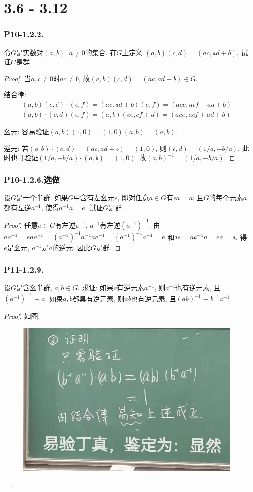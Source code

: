 \documentclass[12pt, a4paper, fontset=windows]{ctexart}
\newcommand{\xuan}{{\normalsize 选做}}
\begin{document}
\clearpage
{}
\part{3.6 - 3.12}

\section*{P10-1.2.2.}

令$G$是实数对$(a,b)$, $a\ne 0$的集合. 在$G$上定义
$(a,b)(c,d)=(ac,ad+b)$. 试证$G$是群. 

\begin{proof}
当$a,c\ne 0$时$ac\ne 0$, 故$(a,b)(c,d)=(ac,ad+b)\in G$. 

结合律: 
\begin{gather*}
(a,b)(c,d)\cdot(e,f)=(ac,ad+b)(e,f)=(ace,acf+ad+b)\\
(a,b)\cdot(c,d)(e,f)=(a,b)(ce,cf+d)=(ace,acf+ad+b)
\end{gather*}

幺元: 
容易验证$(a,b)(1,0)=(1,0)(a,b)=(a,b)$. 

逆元: 
若$(a,b)\cdot(c,d)=(ac,ad+b)=(1,0)$, 则$(c,d)=(1/a,-b/a)$, 
此时也可验证$(1/a,-b/a)\cdot(a,b)=(1,0)$. 故$(a,b)^{-1}=(1/a,-b/a)$. 
\end{proof}

\section*{P10-1.2.6.\xuan}

设$G$是一个半群. 如果$G$中含有左幺元$e$, 即对任意$a\in G$有$ea=a$; 
且$G$的每个元素$a$都有左逆$a^{-1}$, 使得$a^{-1}a=e$. 试证$G$是群. 

\begin{proof}
任意$a\in G$有左逆$a^{-1}$, $a^{-1}$有左逆$(a^{-1})^{-1}$. 
由$aa^{-1}=eaa^{-1}=(a^{-1})^{-1}a^{-1}aa^{-1}=(a^{-1})^{-1}a^{-1}=e$
和$ae=aa^{-1}a=ea=a$, 得$e$是幺元, $a^{-1}$是$a$的逆元. 
因此$G$是群. 
\end{proof}

\section*{P11-1.2.9.}

设$G$是含幺半群, $a,b\in G$. 求证: 
如果$a$有逆元素$a^{-1}$, 则$a^{-1}$也有逆元素, 且$(a^{-1})^{-1}=a$; 
如果$a,b$都具有逆元素, 则$ab$也有逆元素, 且$(ab)^{-1}=b^{-1}a^{-1}$. 

\begin{proof}
如图. 

\begin{figure}[!htbp]
\centering
\includegraphics[width=.4\textwidth]{figs/yydz.jpg}
\end{figure}

\end{proof}
\end{document}

